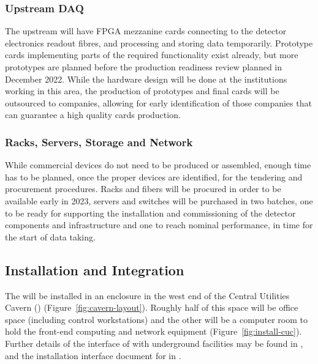 \subsubsection{Upstream DAQ}
The upstream  will have FPGA mezzanine cards connecting to the detector electronics readout fibres, and processing and storing data temporarily. Prototype cards implementing parts of the required functionality exist already, but more prototypes are planned before the production readiness review planned in December 2022. While the hardware design will be done at the institutions working in this area, the production of prototypes and final cards will be outsourced to companies, allowing for early identification of those companies that can guarantee a high quality cards production.

\subsubsection{Racks, Servers, Storage and Network}
While commercial devices do not need to be produced or assembled, enough time has to be planned, once the proper devices are identified, for the tendering and procurement procedures. Racks and fibers will be procured in order to be available early in 2023, servers and switches will be purchased in two batches, one to be ready for supporting the installation and commissioning of the detector components and  infrastructure and one to reach nominal performance, in time for the start of data taking.

\subsection{Installation and Integration}


The  will be installed in an enclosure in the west end of the Central
Utilities Cavern () (Figure~\ref{fig:cavern-layout}).  Roughly
half of this space will be office space (including control
workstations) and the other will be a computer room to hold the 
front-end computing and network equipment (Figure~\ref{fig:install-cuc}). Further details of the interface of  with underground facilities
may be found in , and the installation interface document for  in .

